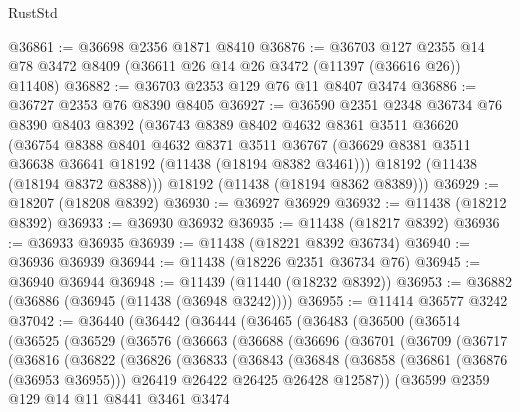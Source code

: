 \begin{lexlean}{RustStd}
\begin{coremodule}
@36861 := @36698 @2356 @1871 @8410
@36876 := @36703
    @127
    @2355
    @14
    @78
    @3472
    @8409
    (@36611 @26 @14 @26 @3472 (@11397 (@36616 @26)) @11408)
@36882 := @36703 @2353 @129 @76 @11 @8407 @3474
@36886 := @36727 @2353 @76 @8390 @8405
@36927 := @36590
    @2351
    @2348
    @36734
    @76
    @8390
    @8403
    @8392
    (@36743
      @8389
      @8402
      @4632
      @8361
      @3511
      @36620
      (@36754
        @8388
        @8401
        @4632
        @8371
        @3511
        @36767
        (@36629 @8381 @3511 @36638 @36641 @18192 (@11438 (@18194 @8382 @3461)))
        @18192
        (@11438 (@18194 @8372 @8388)))
      @18192
      (@11438 (@18194 @8362 @8389)))
@36929 := @18207 (@18208 @8392)
@36930 := @36927 @36929
@36932 := @11438 (@18212 @8392)
@36933 := @36930 @36932
@36935 := @11438 (@18217 @8392)
@36936 := @36933 @36935
@36939 := @11438 (@18221 @8392 @36734)
@36940 := @36936 @36939
@36944 := @11438 (@18226 @2351 @36734 @76)
@36945 := @36940 @36944
@36948 := @11439 (@11440 (@18232 @8392))
@36953 := @36882 (@36886 (@36945 (@11438 (@36948 @3242))))
@36955 := @11414 @36577 @3242
@37042 := @36440
    (@36442
      (@36444
        (@36465
          (@36483
            (@36500
              (@36514
                (@36525
                  (@36529
                    (@36576
                      (@36663
                        (@36688
                          (@36696
                            (@36701
                              (@36709
                                (@36717
                                  (@36816
                                    (@36822
                                      (@36826
                                        (@36833
                                          (@36843
                                            (@36848
                                              (@36858
                                                (@36861 (@36876 (@36953 @36955)))
                                                @26419
                                                @26422
                                                @26425
                                                @26428
                                                @12587))
                                            (@36599
                                              @2359
                                              @129
                                              @14
                                              @11
                                              @8441
                                              @3461
                                              @3474

\end{coremodule}
\end{lexlean}
